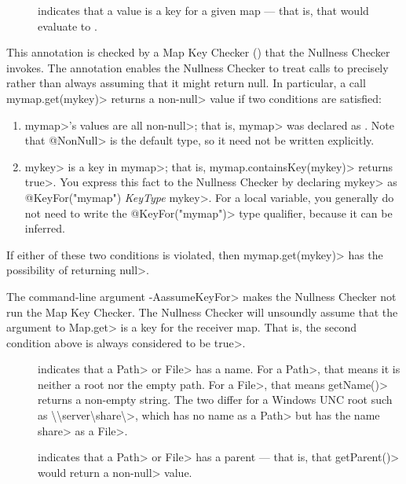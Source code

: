 
\begin{description}
\item[]
    indicates that a value is a key for a given map --- that is, that
     would evaluate to .
\end{description}

This annotation is checked by a Map Key Checker
() that the Nullness Checker
invokes.  The  annotation enables
the Nullness Checker to treat calls to
precisely rather than always assuming that it might return null.  In particular,
a call \<mymap.get(mykey)> returns a non-\<null> value if two conditions
are satisfied:
\begin{enumerate}
\item \<mymap>'s values are all non-\<null>; that is, \<mymap> was
  declared as .  Note
  that \<@NonNull> is the default type, so it need not be written explicitly.
\item \<mykey> is a key in \<mymap>; that is, \<mymap.containsKey(mykey)>
  returns \<true>.  You express this fact to the Nullness Checker by
  declaring \<mykey> as \<@KeyFor("mymap") \emph{KeyType} mykey>.  For a
  local variable, you generally do not need to write the
  \<@KeyFor("mymap")> type qualifier, because it can be inferred.
\end{enumerate}
\noindent
If either of these two conditions is violated, then \<mymap.get(mykey)> has
the possibility of returning \<null>.

The command-line argument \<-AassumeKeyFor> makes the Nullness Checker not
run the Map Key Checker.  The Nullness Checker will unsoundly assume that
the argument to \<Map.get> is a key for the receiver map.  That is, the
second condition above is always considered to be \<true>.


\iffalse %

\begin{description}
\item[]
    indicates that a \<Path> or \<File> has a name.  For a \<Path>, that
    means it is neither a root nor the empty path.  For a \<File>, that
    means \<getName()> returns a non-empty string.  The two differ for a
    Windows UNC root such as
    \<\textbackslash{}\textbackslash{}server\textbackslash{}share\textbackslash{}>,
    which has no name as a \<Path> but has the name \<share> as a \<File>.
\item[]
    indicates that a \<Path> or \<File> has a parent --- that is, that
    \<getParent()> would return a non-\<null> value.
\end{description}

